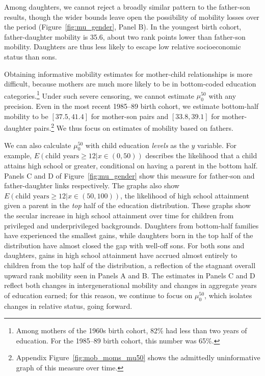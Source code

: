 \documentclass[12pt,letterpaper]{article}
\numberwithin{equation}{section}
\begin{document}
Among daughters, we cannot reject a broadly similar pattern to the father-son results, though the wider bounds leave open the possibility of mobility losses over the period (Figure~\ref{fig:mu_gender}, Panel B). In the youngest birth cohort, father-daughter mobility is 35.6, about two rank points lower than father-son mobility. Daughters are thus less likely to escape low relative socioeconomic status than sons.

Obtaining informative mobility estimates for mother-child relationships is more difficult, because mothers are much more likely to be in bottom-coded education categories.\footnote{Among mothers of the 1960s birth cohort, 82\% had less than two years of education. For the 1985--89 birth cohort, this number was 65\%.} Under such severe censoring, we cannot estimate $\mu_0^{50}$ with any precision. Even in the most recent 1985--89 birth cohort, we estimate bottom-half mobility to be $[37.5, 41.4]$ for mother-son pairs and $[33.8, 39.1]$ for mother-daughter pairs.\footnote{Appendix Figure~\ref{fig:mob_moms_mu50} shows the admittedly uninformative graph of this measure over time.}  We thus focus on estimates of mobility based on fathers.

We can also calculate $\mu_0^{50}$ with child education \textit{levels} as the $y$ variable. For example, $E(\text{child years} \geq 12 | x \in (0, 50))$ describes the likelihood that a child attains high school or greater, conditional on having a parent in the bottom half.  Panels C and D of Figure~\ref{fig:mu_gender} show this measure for father-son and father-daughter links respectively.  The graphs also show $E(\text{child years} \geq 12 | x \in (50, 100))$, the likelihood of high school attainment given a parent in the \textit{top} half of the education distribution. These graphs show the secular increase in high school attainment over time for children from privileged and underprivileged backgrounds. Daughters from bottom-half families have experienced the smallest gains, while daughters born in the top half of the distribution have almost closed the gap with well-off sons. For both sons and daughters, gains in high school attainment have accrued almost entirely to children from the top half of the distribution, a reflection of the stagnant overall upward rank mobility seen in Panels A and B. The estimates in Panels C and D reflect both changes in intergenerational mobility and changes in aggregate years of education earned; for this reason, we continue to focus on $\mu_0^{50}$, which isolates changes in relative status, going forward.
\end{document}
